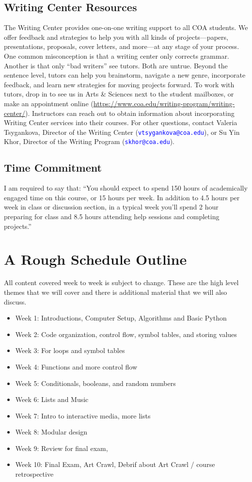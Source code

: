 \documentclass[12pt]{article}
\begin{document}
\subsection{Writing Center Resources}
The Writing Center provides one-on-one writing support to all COA students.
We offer feedback and strategies to help you with all kinds of projects—papers, presentations, proposals, cover letters, and more—at any stage of your process.
One common misconception is that a writing center only corrects grammar.
Another is that only “bad writers” see tutors.
Both are untrue.
Beyond the sentence level, tutors can help you brainstorm, navigate a new genre, incorporate feedback, and learn new strategies for moving projects forward.
To work with tutors, drop in to see us in Arts \& Sciences next to the student mailboxes, or make an appointment online (\url{https://www.coa.edu/writing-program/writing-center/}).
Instructors can reach out to obtain information about incorporating Writing Center services into their courses.
For other questions, contact Valeria Tsygankova, Director of the Writing Center (\textcolor{blue}{\texttt{vtsygankova@coa.edu}}), or Su Yin Khor, Director of the Writing Program (\textcolor{blue}{\texttt{skhor@coa.edu}}).

\subsection{Time Commitment}
I am required to say that: ``You should expect to spend 150 hours of academically engaged time on this course, or 15 hours per week. In addition to 4.5 hours per week in class or discussion section, in a typical week you'll spend 2 hour preparing for class and 8.5 hours attending help sessions and completing projects.''

\section{A Rough Schedule Outline}
All content covered week to week is subject to change.
These are the high level themes that we will cover and there is additional material that we will also discuss.

\begin{itemize}
\item Week 1: Introductions, Computer Setup, Algorithms and Basic Python
\item Week 2: Code organization, control flow, symbol tables, and storing values
\item Week 3: For loops and symbol tables
\item Week 4: Functions and more control flow
\item Week 5: Conditionals, booleans, and random numbers
\item Week 6: Lists and Music
\item Week 7: Intro to interactive media, more lists
\item Week 8: Modular design 
\item Week 9: Review for final exam, 
\item Week 10: Final Exam, Art Crawl, Debrif about Art Crawl / course retrospective
\end{itemize}
\end{document}

